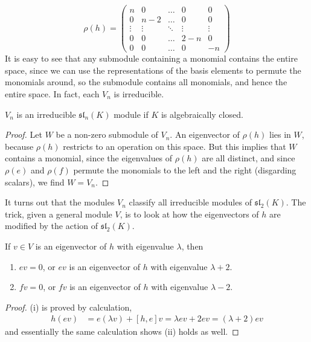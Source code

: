 \[ \rho(h) = \begin{pmatrix} n & 0 & \dots & 0 & 0 \\ 0 & n-2 & \dots & 0 & 0 \\ \vdots & \vdots & \ddots & \vdots & \vdots \\ 0 & 0 & \dots & 2 - n & 0 \\ 0 & 0 & \dots & 0 & -n \end{pmatrix} \]
%
It is easy to see that any submodule containing a monomial contains the entire space, since we can use the representations of the basis elements to permute the monomials around, so the submodule contains all monomials, and hence the entire space. In fact, each $V_n$ is irreducible.

\begin{theorem}
    $V_n$ is an irreducible $\mathfrak{sl}_n(K)$ module if $K$ is algebraically closed.
\end{theorem}
\begin{proof}
    Let $W$ be a non-zero submodule of $V_n$. An eigenvector of $\rho(h)$ lies in $W$, because $\rho(h)$ restricts to an operation on this space. But this implies that $W$ contains a monomial, since the eigenvalues of $\rho(h)$ are all distinct, and since $\rho(e)$ and $\rho(f)$ permute the monomials to the left and the right (disgarding scalars), we find $W = V_n$.
\end{proof}

It turns out that the modules $V_n$ classify all irreducible modules of $\mathfrak{sl}_2(K)$. The trick, given a general module $V$, is to look at how the eigenvectors of $h$ are modified by the action of $\mathfrak{sl}_2(K)$.

\begin{lemma}
    If $v \in V$ is an eigenvector of $h$ with eigenvalue $\lambda$, then
    \begin{enumerate}
        \item[(i)] $ev = 0$, or $ev$ is an eigenvector of $h$ with eigenvalue $\lambda + 2$.
        \item[(ii)] $fv = 0$, or $fv$ is an eigenvector of $h$ with eigenvalue $\lambda - 2$.
    \end{enumerate}
\end{lemma}
\begin{proof}
    (i) is proved by calculation,
    \begin{align*}
        h(ev) &= e(\lambda v) + [h, e] v = \lambda ev + 2ev = (\lambda + 2) ev
    \end{align*}
    and essentially the same calculation shows (ii) holds as well.
\end{proof}

